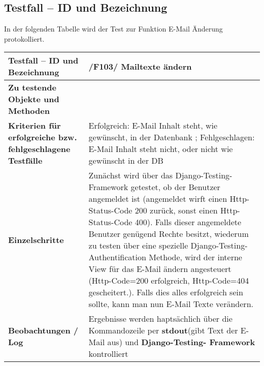 \subsection{Testfall -- ID und Bezeichnung}
In der folgenden Tabelle wird der Test zur Funktion E-Mail Änderung protokolliert.
\begin{longtable}{|p{5cm}|p{10cm}|}
\hline
\textbf{Testfall -- ID und Bezeichnung} &  \textnormal{/F103/ Mailtexte ändern} \\
\hline
\textbf{Zu testende Objekte und Methoden} &  \textnormal{
\begin{itemize}
\item In Komponente \emph{Admin} der Bereich E-Mail 
\end{itemize} }
\\
\hline
\textbf{Kriterien f\"ur erfolgreiche bzw. fehlgeschlagene Testf\"alle} &
\textnormal{Erfolgreich: E-Mail Inhalt steht, wie gewünscht, in der Datenbank ;
        Fehlgeschlagen: E-Mail Inhalt steht nicht, oder nicht wie gewünscht in der DB   } \\
\hline
\textbf{Einzelschritte} &  \textnormal{Zunächst wird über das Django-Testing-Framework getestet,
ob der Benutzer angemeldet ist (angemeldet wirft einen Http-Status-Code 200 zurück, sonst 
einen Http-Status-Code 400). Falls dieser angemeldete Benutzer genügend Rechte besitzt,
wiederum zu testen über eine spezielle Django-Testing-Authentification Methode, wird der interne View
für das E-Mail ändern angesteuert (Http-Code=200 erfolgreich, Http-Code=404 gescheitert.).
Falls dies alles erfolgreich sein sollte, kann man nun E-Mail Texte verändern.
} \\
\hline
\textbf{Beobachtungen / Log} &  \textnormal{Ergebnisse werden haptsächlich über 
die Kommandozeile per \textbf{stdout}(gibt Text der E-Mail aus) und \textbf{Django-Testing-
Framework} kontrolliert  } \\
\hline


 \end{longtable}



